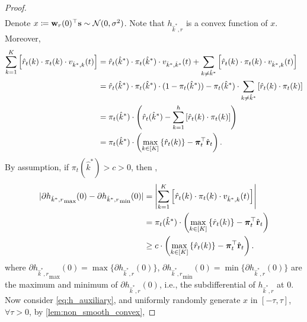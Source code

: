 \begin{proof}
\begin{equation}
\begin{split}
\end{split}
\end{equation}
Denote $x \coloneqq {\mathbf{w}}_r(0)^\top {\mathbf{s}} \sim {\mathcal{N}}(0, \sigma^2)$. Note that $h_{\hat{k}^*,r}$ is a convex function of $x$. Moreover,
\begin{equation*}
\begin{split}
	\sum\limits_{k=1}^{K}{ \left[ \hat{r}_{t}(k) \cdot \pi_{t}(k) \cdot v_{\hat{k}^*,k}(t) \right] } &= \hat{r}_{t}(\hat{k}^*) \cdot \pi_{t}(\hat{k}^*) \cdot v_{\hat{k}^*,\hat{k}^*}(t) + \sum\limits_{k\not=\hat{k}^*}{ \left[ \hat{r}_{t}(k) \cdot \pi_{t}(k) \cdot v_{\hat{k}^*,k}(t) \right] } \\
	&= \hat{r}_{t}(\hat{k}^*) \cdot \pi_{t}(\hat{k}^*) \cdot ( 1 - \pi_{t}(\hat{k}^*) ) - \pi_{t}(\hat{k}^*) \cdot \sum\limits_{k\not=\hat{k}^*}{ \left[ \hat{r}_{t}(k) \cdot \pi_{t}(k) \right] } \\
	&= \pi_{t}(\hat{k}^*) \cdot \left( \hat{r}_{t}(\hat{k}^*) - \sum\limits_{k=1}^{h}{ \left[ \hat{r}_{t}(k) \cdot \pi_{t}(k) \right] } \right) \\
	&= \pi_{t}(\hat{k}^*) \cdot \left( \max\limits_{k \in \left[K\right]}\left\{ \hat{r}_t(k) \right\} - {\boldsymbol{\pi}}_t^\top \hat{{\mathbf{r}}}_t  \right).
\end{split}
\end{equation*}
By assumption, if $\pi_{t}(\hat{k}^*) > c > 0$, then ,
\begin{equation*}
\begin{split}
	| \partial{h_{\hat{k}^*,r}}_{\max}{(0)} - \partial{h_{\hat{k}^*,r}}_{\min}{(0)} | &= \left| \sum\limits_{k=1}^{K}{ \left[  \hat{r}_{t}(k) \cdot \pi_{t}(k) \cdot v_{\hat{k}^*,k}(t) \right] } \right| \\
	&= \pi_{t}(\hat{k}^*) \cdot \left( \max\limits_{k \in \left[K\right]}\left\{ \hat{r}_t(k) \right\} - {\boldsymbol{\pi}}_t^\top \hat{{\mathbf{r}}}_t  \right) \\
	&\ge c \cdot \left( \max\limits_{k \in \left[K\right]}\left\{ \hat{r}_t(k) \right\} - {\boldsymbol{\pi}}_t^\top \hat{{\mathbf{r}}}_t  \right).
\end{split}
\end{equation*}
where $\partial{h_{\hat{k}^*,r}}_{\max}{(0)} = \max\{ \partial{h_{\hat{k}^*,r}}{(0)} \}$, $\partial{h_{\hat{k}^*,r}}_{\min}{(0)} = \min\{ \partial{h_{\hat{k}^*,r}}{(0)} \}$ are the maximum and minimum of $\partial{h_{\hat{k}^*,r}}{(0)}$, i.e., the subdifferential of $h_{\hat{k}^*,r}$ at $0$. Now consider \cref{eq:h_auxiliary}, and uniformly randomly generate $x$ in $\left[ -\tau, \tau \right]$, $\forall \tau > 0$, by \cref{lem:non_smooth_convex},

\end{proof}
